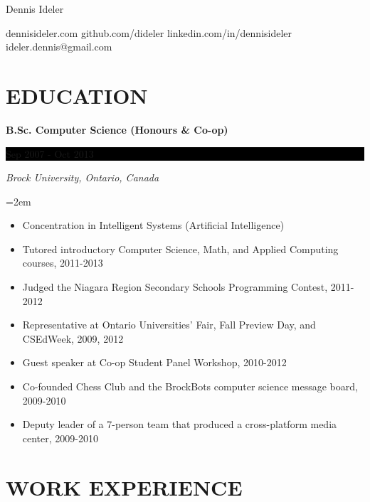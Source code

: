 \documentclass[paper=a4,fontsize=11pt]{scrartcl} %
\newlength{\spacebox}
\newcommand{\sepspace}{\vspace*{1em}}   %
\newcommand{\MyName}[1]{ %
    \Huge \usefont{OT1}{phv}{b}{n} \hfill #1
    \par \normalsize \normalfont}
\newcommand{\MySlogan}[1]{ %
    \large \usefont{OT1}{phv}{m}{n}\hfill \textit{#1}
    \par \normalsize \normalfont}
\newcommand{\NewPart}[1]{\section*{\uppercase{#1}}}
\newcommand{\PersonalEntry}[2]{
    \noindent\hangindent=2em\hangafter=0 %
    \parbox{\spacebox}{                  %
    \textit{#1}}                      %
    \hspace{1.5em} #2 \par}              %
\newcommand{\EducationEntry}[4]{
    \noindent \textbf{#1} \hfill      %
    \colorbox{Black}{
      \parbox{8.5em}{
      \hfill\color{White}#2}} \par  %
    \noindent \textit{#3} \par        %
    \noindent\hangindent=2em\hangafter=0 \small #4 %
    \normalsize \par}
\begin{document}

\MyName{Dennis Ideler}
\bigskip
{\small dennisideler.com \quad github.com/dideler \quad linkedin.com/in/dennisideler \quad ideler.dennis@gmail.com}

\sepspace

%

\NewPart{Education}{}

\EducationEntry{B.Sc. Computer Science (Honours \& Co-op)}
{Sep 2007 - Oct 2013}
{Brock University, Ontario, Canada}
{
 \begin{itemize}  \itemsep -1pt %
   \item Concentration in Intelligent Systems (Artificial Intelligence)
   \item Tutored introductory Computer Science, Math, and Applied Computing courses, 2011-2013
   \item Judged the Niagara Region Secondary Schools Programming Contest, 2011-2012
   \item Representative at Ontario Universities' Fair, Fall Preview Day,
   and CSEdWeek, 2009, 2012
   \item Guest speaker at Co-op Student Panel Workshop, 2010-2012
   \item Co-founded Chess Club and the BrockBots computer science
   message board, 2009-2010
   \item Deputy leader of a 7-person team that produced a cross-platform media center, 2009-2010
 \end{itemize}
}

\NewPart{Work experience}{}

\end{document}
